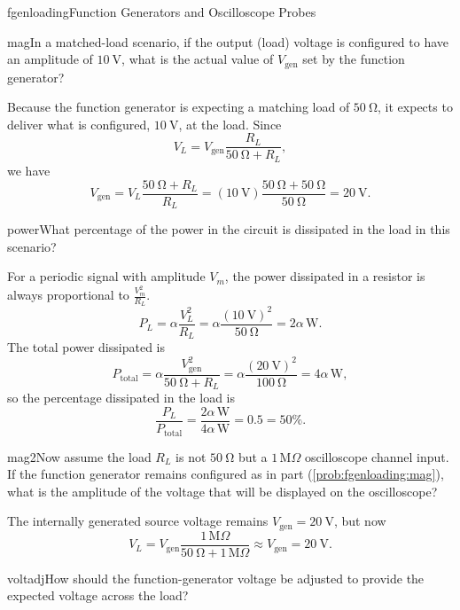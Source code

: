 \begin{mainquestion}{fgenloading}{Function Generators and Oscilloscope Probes}
\begin{partquestion}{mag}{In a matched-load scenario, if the output (load) voltage is configured to have an amplitude of $\qty{10}{\volt}$, what is the actual value of $V_\mathrm{gen}$ set by the function generator?}
\begin{answer}
Because the function generator is expecting a matching load of $\qty{50}{\ohm}$, it expects
to deliver what is configured, $\qty{10}{\volt}$, at the load. Since
\[
V_L = V_{\mathrm{gen}}\frac{R_L}{\qty{50}{\ohm} + R_L},
\]
we have
\[
V_{\mathrm{gen}}
=V_L\frac{\qty{50}{\ohm}+R_L}{R_L}
=(\qty{10}{\volt})\frac{\qty{50}{\ohm}+\qty{50}{\ohm}}{\qty{50}{\ohm}}
=\qty{20}{\volt}.
\]
\end{answer}
\end{partquestion}
\begin{partquestion}{power}{What percentage of the power in the circuit is dissipated in the load in this scenario?}
\begin{answer}
For a periodic signal with amplitude $V_m$, the power dissipated in a resistor is always proportional to $\frac{V_m^2}{R_L}$.  
\[
P_L=\alpha\frac{V_L^2}{R_L}
=\alpha\frac{(\qty{10}{\volt})^2}{\qty{50}{\ohm}}
=2\alpha\,\mathrm{W}.
\]
The total power dissipated is
\[
P_{\mathrm{total}}
=\alpha\frac{V_{\mathrm{gen}}^2}{\qty{50}{\ohm}+R_L}
=\alpha\frac{(\qty{20}{\volt})^2}{\qty{100}{\ohm}}
=4\alpha\,\mathrm{W},
\]
so the percentage dissipated in the load is
\[
\frac{P_L}{P_{\mathrm{total}}}
=\frac{2\alpha\,\mathrm{W}}{4\alpha\,\mathrm{W}}
=0.5=50\%.
\]
\end{answer}
\end{partquestion}
\begin{partquestion}{mag2}{Now assume the load $R_L$ is not $\qty{50}{\ohm}$ but a $1\,\mathrm{M}\Omega$ oscilloscope channel input. If the function generator remains configured as in part (\cref{prob:fgenloading:mag}), what is the amplitude of the voltage that will be displayed on the oscilloscope?}
\begin{answer}
The internally generated source voltage remains $V_{\mathrm{gen}}=\qty{20}{\volt}$, but now
\[
V_L
=V_{\mathrm{gen}}\frac{1\,\mathrm{M}\Omega}
{\qty{50}{\ohm}+1\,\mathrm{M}\Omega}
\approx V_{\mathrm{gen}}
=\qty{20}{\volt}.
\]
\end{answer}
\end{partquestion}
\begin{partquestion}{voltadj}{How should the function-generator voltage be adjusted to provide the expected voltage across the load?}
\begin{answer}

\end{answer}
\end{partquestion}
\end{mainquestion}
